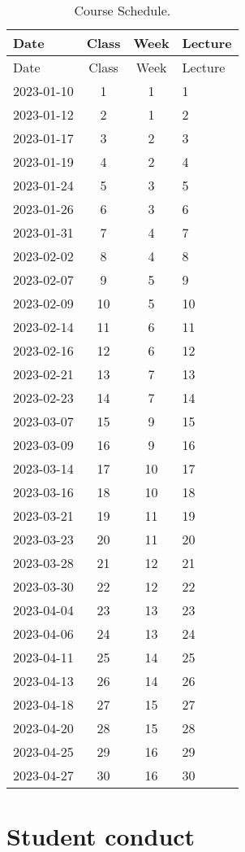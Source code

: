 \documentclass[11pt,]{article}
\begin{document}
\begin{longtable}[]{@{}lccl@{}}
\caption{Course Schedule.}\tabularnewline
\toprule()
Date & Class & Week & Lecture \\
\midrule()
\endfirsthead
\toprule()
Date & Class & Week & Lecture \\
\midrule()
\endhead
2023-01-10 & 1 & 1 & 1 \\
2023-01-12 & 2 & 1 & 2 \\
2023-01-17 & 3 & 2 & 3 \\
2023-01-19 & 4 & 2 & 4 \\
2023-01-24 & 5 & 3 & 5 \\
2023-01-26 & 6 & 3 & 6 \\
2023-01-31 & 7 & 4 & 7 \\
2023-02-02 & 8 & 4 & 8 \\
2023-02-07 & 9 & 5 & 9 \\
2023-02-09 & 10 & 5 & 10 \\
2023-02-14 & 11 & 6 & 11 \\
2023-02-16 & 12 & 6 & 12 \\
2023-02-21 & 13 & 7 & 13 \\
2023-02-23 & 14 & 7 & 14 \\
2023-03-07 & 15 & 9 & 15 \\
2023-03-09 & 16 & 9 & 16 \\
2023-03-14 & 17 & 10 & 17 \\
2023-03-16 & 18 & 10 & 18 \\
2023-03-21 & 19 & 11 & 19 \\
2023-03-23 & 20 & 11 & 20 \\
2023-03-28 & 21 & 12 & 21 \\
2023-03-30 & 22 & 12 & 22 \\
2023-04-04 & 23 & 13 & 23 \\
2023-04-06 & 24 & 13 & 24 \\
2023-04-11 & 25 & 14 & 25 \\
2023-04-13 & 26 & 14 & 26 \\
2023-04-18 & 27 & 15 & 27 \\
2023-04-20 & 28 & 15 & 28 \\
2023-04-25 & 29 & 16 & 29 \\
2023-04-27 & 30 & 16 & 30 \\
\bottomrule()
\end{longtable}

\newpage

\hypertarget{student-conduct}{%
\section{Student conduct}\label{student-conduct}}
\end{document}
